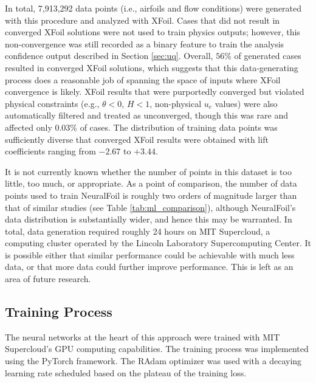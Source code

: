\documentclass[journal]{new-aiaa}
\begin{document}
In total, 7,913,292 data points (i.e., airfoils and flow conditions) were generated with this procedure and analyzed with XFoil. Cases that did not result in converged XFoil solutions were not used to train physics outputs; however, this non-convergence was still recorded as a binary feature to train the analysis confidence output described in Section \ref{sec:uq}. Overall, $56\%$ of generated cases resulted in converged XFoil solutions, which suggests that this data-generating process does a reasonable job of spanning the space of inputs where XFoil convergence is likely. XFoil results that were purportedly converged but violated physical constraints (e.g., $\theta<0$, $H<1$, non-physical $u_e$ values) were also automatically filtered and treated as unconverged, though this was rare and affected only 0.03\% of cases. The distribution of training data points was sufficiently diverse that converged XFoil results were obtained with lift coefficients ranging from $-2.67$ to $+3.44$.

It is not currently known whether the number of points in this dataset is too little, too much, or appropriate. As a point of comparison, the number of data points used to train NeuralFoil is roughly two orders of magnitude larger than that of similar studies (see Table \ref{tab:ml_comparison}), although NeuralFoil's data distribution is substantially wider, and hence this may be warranted. In total, data generation required roughly 24 hours on MIT Supercloud, a computing cluster operated by the Lincoln Laboratory Supercomputing Center. It is possible either that similar performance could be achievable with much less data, or that more data could further improve performance. This is left as an area of future research.

\subsection{Training Process}
\label{sec:training-process}

The neural networks at the heart of this approach were trained with MIT Supercloud's GPU computing capabilities. The training process was implemented using the PyTorch \cite{paszkePyTorchImperativeStyle2019} framework. The RAdam optimizer \cite{liuVarianceAdaptiveLearning2019} was used with a decaying learning rate scheduled based on the plateau of the training loss.
\end{document}
